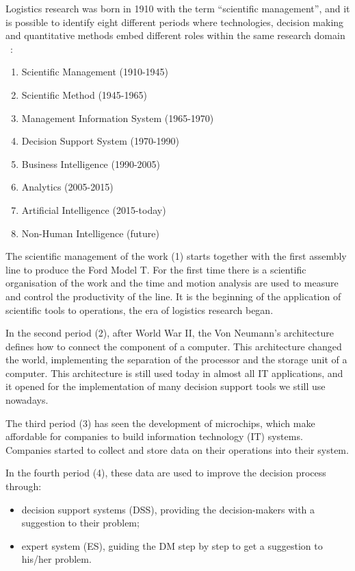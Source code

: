 Logistics research was born in 1910 with the term “scientific management”, and it is possible to identify eight different periods where technologies, decision making and quantitative methods embed different roles within the same research domain ~\cite{Mortenson2015}:

\begin{enumerate}
    \item Scientific Management (1910-1945)
    \item Scientific Method (1945-1965)
    \item Management Information System (1965-1970)
    \item Decision Support System (1970-1990)
    \item Business Intelligence (1990-2005)
    \item Analytics (2005-2015)
    \item Artificial Intelligence (2015-today)
    \item Non-Human Intelligence (future)

\end{enumerate}

The scientific management of the work (1) starts together with the first assembly line to produce the Ford Model T. For the first time there is a scientific organisation of the work and the time and motion analysis are used to measure and control the productivity of the line. It is the beginning of the application of scientific tools to operations, the era of logistics research began.\par

In the second period (2), after World War II, the Von Neumann's architecture defines how to connect the component of a computer. This architecture changed the world, implementing the separation of the processor and the storage unit of a computer. This architecture is still used today in almost all IT applications, and it opened for the implementation of many decision support tools we still use nowadays.\par

The third period (3) has seen the development of microchips, which make affordable for companies to build information technology (IT) systems. Companies started to collect and store data on their operations into their system.\par

In the fourth period (4), these data are used to improve the decision process through: 

\begin{itemize}
    \item decision support systems (DSS), providing the decision-makers with a suggestion to their problem;
    \item expert system (ES), guiding the DM step by step to get a suggestion to his/her problem.

\end{itemize}

